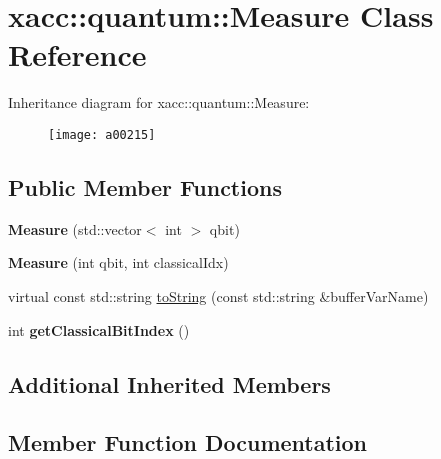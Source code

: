 \hypertarget{a00215}{}\section{xacc\+:\+:quantum\+:\+:Measure Class Reference}
\label{a00215}
Inheritance diagram for xacc\+:\+:quantum\+:\+:Measure\+:\begin{figure}[H]
\begin{center}
\leavevmode
\texttt{[image: a00215]}
\end{center}
\end{figure}
\subsection*{Public Member Functions}
\begin{DoxyCompactItemize}
\item 
{\bfseries Measure} (std\+::vector$<$ int $>$ qbit)\hypertarget{a00215_afe330a0eea029d842ff9c88a817dcc7d}{}\label{a00215_afe330a0eea029d842ff9c88a817dcc7d}

\item 
{\bfseries Measure} (int qbit, int classical\+Idx)\hypertarget{a00215_a9b8d9edca8ad2c3fb132780200f17335}{}\label{a00215_a9b8d9edca8ad2c3fb132780200f17335}

\item 
virtual const std\+::string \hyperlink{a00215_a1c51a5d68294dcb2ba1a9fbea63a730f}{to\+String} (const std\+::string \&buffer\+Var\+Name)
\item 
int {\bfseries get\+Classical\+Bit\+Index} ()\hypertarget{a00215_a0cb3c94731544042807236ade36fddd0}{}\label{a00215_a0cb3c94731544042807236ade36fddd0}

\end{DoxyCompactItemize}
\subsection*{Additional Inherited Members}


\subsection{Member Function Documentation}
